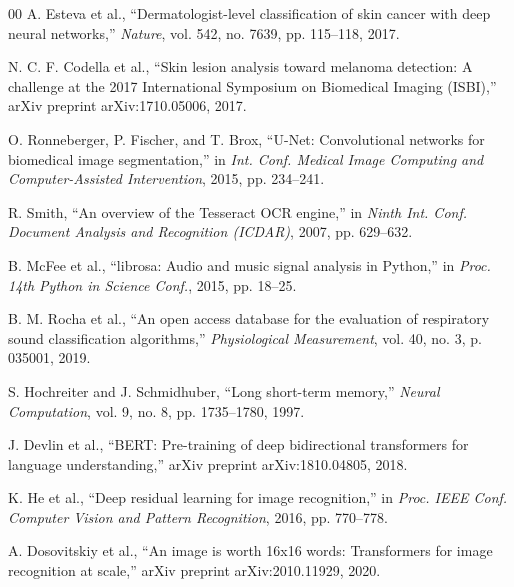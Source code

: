 \documentclass[conference]{IEEEtran}
\begin{document}
\begin{thebibliography}{00}
A. Esteva et al., ``Dermatologist-level classification of skin cancer with deep neural networks,'' \textit{Nature}, vol. 542, no. 7639, pp. 115--118, 2017.

N. C. F. Codella et al., ``Skin lesion analysis toward melanoma detection: A challenge at the 2017 International Symposium on Biomedical Imaging (ISBI),'' arXiv preprint arXiv:1710.05006, 2017.

O. Ronneberger, P. Fischer, and T. Brox, ``U-Net: Convolutional networks for biomedical image segmentation,'' in \textit{Int. Conf. Medical Image Computing and Computer-Assisted Intervention}, 2015, pp. 234--241.

R. Smith, ``An overview of the Tesseract OCR engine,'' in \textit{Ninth Int. Conf. Document Analysis and Recognition (ICDAR)}, 2007, pp. 629--632.

B. McFee et al., ``librosa: Audio and music signal analysis in Python,'' in \textit{Proc. 14th Python in Science Conf.}, 2015, pp. 18--25.

B. M. Rocha et al., ``An open access database for the evaluation of respiratory sound classification algorithms,'' \textit{Physiological Measurement}, vol. 40, no. 3, p. 035001, 2019.

S. Hochreiter and J. Schmidhuber, ``Long short-term memory,'' \textit{Neural Computation}, vol. 9, no. 8, pp. 1735--1780, 1997.

J. Devlin et al., ``BERT: Pre-training of deep bidirectional transformers for language understanding,'' arXiv preprint arXiv:1810.04805, 2018.

K. He et al., ``Deep residual learning for image recognition,'' in \textit{Proc. IEEE Conf. Computer Vision and Pattern Recognition}, 2016, pp. 770--778.

A. Dosovitskiy et al., ``An image is worth 16x16 words: Transformers for image recognition at scale,'' arXiv preprint arXiv:2010.11929, 2020.
\end{thebibliography}
\end{document}
